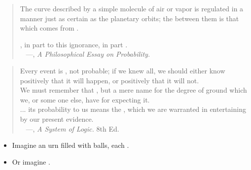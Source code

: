 \documentclass[10pt]{report}
\begin{document}
\begin{quote}
\footnotesize 

The curve described by a simple molecule of air or vapor is regulated in a manner just as certain as the planetary orbits;  the  between them is that which comes from .

, in part to this ignorance, in part .
\\ \mbox{ } \hfill {\scriptsize ---, {\slshape A Philosophical Essay on Probability.}}
\end{quote}
%
\begin{quote}
\footnotesize
Every event is , not probable; if we knew all, we should either know positively that it will happen, or positively that it will not.
\\[6pt]
We must remember that , but a mere name for the degree of ground which we, or some one else, have for expecting it.
\\[6pt]
... its probability to us means the , which we are warranted in entertaining by our present evidence.
\\ \mbox{ } \hfill {\scriptsize ---, {\slshape A System of Logic.} 8th Ed.}
\end{quote}


%
\begin{itemize}
\item Imagine an urn filled with balls, each .
\vfill
\item Or imagine .
\vfill
\end{itemize}
\end{document}

